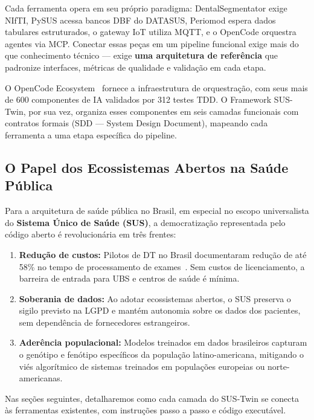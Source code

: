 Cada ferramenta opera em seu próprio paradigma: DentalSegmentator exige NIfTI, PySUS acessa bancos DBF do DATASUS, Periomod espera dados tabulares estruturados, o gateway IoT utiliza MQTT, e o OpenCode orquestra agentes via MCP. Conectar essas peças em um pipeline funcional exige mais do que conhecimento técnico --- exige \textbf{uma arquitetura de referência} que padronize interfaces, métricas de qualidade e validação em cada etapa.

O OpenCode Ecosystem~\cite{opencode2026ecosystem} fornece a infraestrutura de orquestração, com seus mais de 600 componentes de IA validados por 312 testes TDD. O Framework SUS-Twin, por sua vez, organiza esses componentes em seis camadas funcionais com contratos formais (SDD --- System Design Document), mapeando cada ferramenta a uma etapa específica do pipeline.

\subsection{O Papel dos Ecossistemas Abertos na Saúde Pública}

Para a arquitetura de saúde pública no Brasil, em especial no escopo universalista do \textbf{Sistema Único de Saúde (SUS)}, a democratização representada pelo código aberto é revolucionária em três frentes:

\begin{enumerate}
    \item \textbf{Redução de custos:} Pilotos de DT no Brasil documentaram redução de até 58\% no tempo de processamento de exames~\cite{frota2025sus}. Sem custos de licenciamento, a barreira de entrada para UBS e centros de saúde é mínima.
    
    \item \textbf{Soberania de dados:} Ao adotar ecossistemas abertos, o SUS preserva o sigilo previsto na LGPD e mantém autonomia sobre os dados dos pacientes, sem dependência de fornecedores estrangeiros.
    
    \item \textbf{Aderência populacional:} Modelos treinados em dados brasileiros capturam o genótipo e fenótipo específicos da população latino-americana, mitigando o viés algorítmico de sistemas treinados em populações europeias ou norte-americanas.
\end{enumerate}

Nas seções seguintes, detalharemos como cada camada do SUS-Twin se conecta às ferramentas existentes, com instruções passo a passo e código executável.

